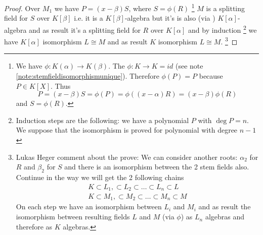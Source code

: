 \begin{theorem}
\begin{proof}
    Over $M_1$ we have $P = (x - \beta) S$, where
    $S = \phi\left(R\right)$
    \footnote{
      We have $\phi: K\left(\alpha\right) \to
      K\left(\beta\right)$. The $\phi: K \to K = id$ (see note
      \ref{note:stemfieldisomorphismunique}).
      Therefore
      $\phi\left(P\right) = P$ because $P \in K\left[X\right]$.
      Thus
      \[
      P = (x - \beta) S = \phi\left(P\right) =
      \phi\left((x - \alpha) R\right) =
      (x - \beta) \phi\left(R\right)
      \]
      and $S = \phi\left(R\right)$.
    }
    $M$ is a splitting field for $S$ over $K\left[\beta\right]$
    i.e. it is a $K\left[\beta\right]$-algebra but it's is also (via
    ) $K\left[\alpha\right]$-algebra and as
    result it's a splitting field for $R$ over $K\left[\alpha\right]$
    and by induction
    \footnote{
      Induction steps are the following: we have a polynomial $P$ with
      $\deg P = n$. We suppose that the isomorphism is proved for
      polynomial with degree $n-1$
    }
    we have $K\left[\alpha\right]$ isomorphism $L \cong M$ and as
    result $K$ isomorphism $L \cong M$.
    \footnote{
      Lukas Heger comment about the prove:
      We can consider 
      another roots: $\alpha_2$ for $R$ and $\beta_2$ for $S$
      and there is an isomorphism between the 2 stem fields
      also. Continue in the way we will get the 2 following chains
      \begin{eqnarray}
        K \subset L_1, \subset L_2 \subset \dots \subset L_n \subset L
        \nonumber \\
        K \subset M_1, \subset M_2 \subset \dots \subset M_n \subset M
        \nonumber
      \end{eqnarray}
      On each step we have an isomorphism between $L_i$ and $M_i$ and as
      result the isomorphism between resulting fields $L$ and $M$ (via
      $\phi$) as $L_n$ algebras and therefore as $K$ algebras. 
    }
  \end{proof}
  \label{thm:lec2_1}
\end{theorem}

